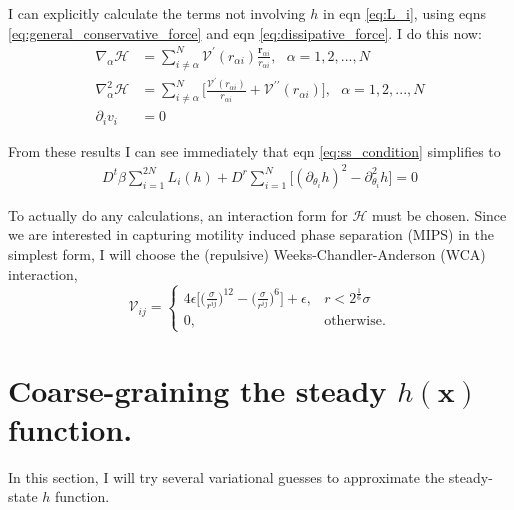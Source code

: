 \documentclass{article}
\begin{document}
I can explicitly calculate the terms not involving $h$ in eqn \ref{eq:L_i}, using eqns
\ref{eq:general_conservative_force} and eqn \ref{eq:dissipative_force}. I do this now:
\begin{subequations}
  \label{eqs:partials_of_L_i}
  \begin{align}
    \nabla_{\alpha}\mathcal{H}
    &=\sum_{i\neq\alpha}^N\mathcal{V}^{\prime}
      (r_{\alpha i})\frac{\bm{r}_{\alpha i}}{r_{\alpha i}},
      \:\:\:\alpha=1,2,...,N\label{eq:partial_H_of_L_i}\\
    \nabla_{\alpha}^2\mathcal{H}
    &=\sum_{i\neq\alpha}^N\bigg[\frac{\mathcal{V}^{\prime}(r_{\alpha i})}{r_{\alpha i}}
      +\mathcal{V}^{\prime\prime}(r_{\alpha i})\bigg],
      \:\:\:\alpha=1,2,...,N\label{eq:partialsq_H_of_L_i}\\
    \partial_i v_i
    &= 0\label{eq:partial_v_of_L_i}
  \end{align}
\end{subequations}

From these results I can see immediately that eqn \ref{eq:ss_condition} simplifies to
\begin{align}\label{eq:steadystatecondition}
  D^t\beta\sum_{i=1}^{2N}L_i(h)+D^r\sum_{i=1}^{N}\big[(\partial_{\theta_i}h)^2
  -\partial_{\theta_i}^2h\big]=0
\end{align}

To actually do any calculations, an interaction form for $\mathcal{H}$ must be chosen. Since we
are interested in capturing motility induced phase separation (MIPS) in the simplest form, I
will choose the (repulsive) Weeks-Chandler-Anderson (WCA) interaction,
\begin{equation}\label{eq:WCAapprox}
  \mathcal{V}_{ij} =
  \begin{cases}
    4\epsilon\bigg[\bigg(\frac{\sigma}{r^{ij}}\bigg)^{12}
    -\bigg(\frac{\sigma}{r^{ij}}\bigg)^6\bigg]+\epsilon, & r<2^{\frac{1}{6}}\sigma \\
    0, & \mathrm{otherwise}.
  \end{cases}
\end{equation}

\newpage
\section{Coarse-graining the steady $h(\bm{x})$ function.}

In this section, I will try several variational guesses to approximate the steady-state $h$
function.
\end{document}
